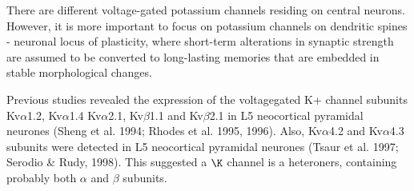 There are different voltage-gated potassium channels residing on central
neurons. However, it is more important to focus on potassium channels on
dendritic spines - neuronal locus of plasticity, where short-term alterations in
synaptic strength are assumed to be converted to long-lasting memories that are
embedded in stable morphological changes.

Previous studies revealed the expression of the voltagegated K+ channel subunits
Kv$\alpha$1.2, Kv$\alpha$1.4 Kv$\alpha$2.1, Kv$\beta$1.1 and Kv$\beta$2.1 in L5
neocortical pyramidal neurones (Sheng et al. 1994; Rhodes et al. 1995, 1996).
Also, Kv$\alpha$4.2 and Kv$\alpha$4.3 subunits were detected in L5 neocortical
pyramidal neurones (Tsaur et al. 1997; Serodio \& Rudy, 1998). This suggested a
$\K$ channel is a heteroners, containing probably both $\alpha$ and $\beta$
subunits.

